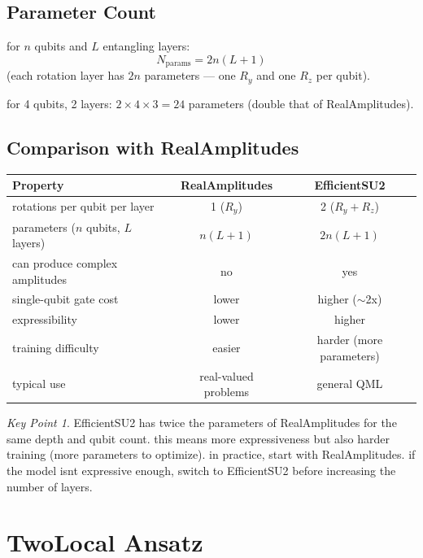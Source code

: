 \documentclass[11pt,a4paper]{article}
\theoremstyle{definition}
\theoremstyle{remark}
\newtheorem*{keypoint}{Key Point}
\begin{document}
\subsection{Parameter Count}

for $n$ qubits and $L$ entangling layers:
\[
N_{\text{params}} = 2n(L + 1)
\]
(each rotation layer has $2n$ parameters --- one $R_y$ and one $R_z$ per qubit).

for 4 qubits, 2 layers: $2 \times 4 \times 3 = 24$ parameters (double that of RealAmplitudes).

\subsection{Comparison with RealAmplitudes}

\begin{center}
\renewcommand{\arraystretch}{1.3}
\begin{tabular}{|l|c|c|}
\hline
\textbf{Property} & \textbf{RealAmplitudes} & \textbf{EfficientSU2} \\
\hline
rotations per qubit per layer & 1 ($R_y$) & 2 ($R_y + R_z$) \\
\hline
parameters ($n$ qubits, $L$ layers) & $n(L+1)$ & $2n(L+1)$ \\
\hline
can produce complex amplitudes & no & yes \\
\hline
single-qubit gate cost & lower & higher ($\sim$2x) \\
\hline
expressibility & lower & higher \\
\hline
training difficulty & easier & harder (more parameters) \\
\hline
typical use & real-valued problems & general QML \\
\hline
\end{tabular}
\end{center}

\begin{keypoint}
EfficientSU2 has twice the parameters of RealAmplitudes for the same depth and qubit count. this means more expressiveness but also harder training (more parameters to optimize). in practice, start with RealAmplitudes. if the model isnt expressive enough, switch to EfficientSU2 before increasing the number of layers.
\end{keypoint}

\section{TwoLocal Ansatz}
\end{document}
